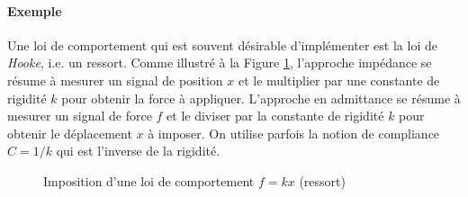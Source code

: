 \paragraph{Exemple} Une loi de comportement qui est souvent désirable d'implémenter est la loi de \textit{Hooke}, i.e. un ressort. Comme illustré à la Figure \ref{fig:impedanceadmitancespring}, l'approche impédance se résume à mesurer un signal de position $x$ et le multiplier par une constante de rigidité $k$ pour obtenir la force à appliquer. L'approche en admittance se résume à mesurer un signal de force $f$ et le diviser par la constante de rigidité $k$ pour obtenir le déplacement $x$ à imposer. On utilise parfois la notion de compliance $C=1/k$ qui est l'inverse de la rigidité. 
\begin{figure}[H]
				\vspace{-10pt}
        \centering
				\hspace{5pt}
        \caption{Imposition d'une loi de comportement $f=kx$ (ressort)}
				\label{fig:impedanceadmitancespring}
\end{figure}

